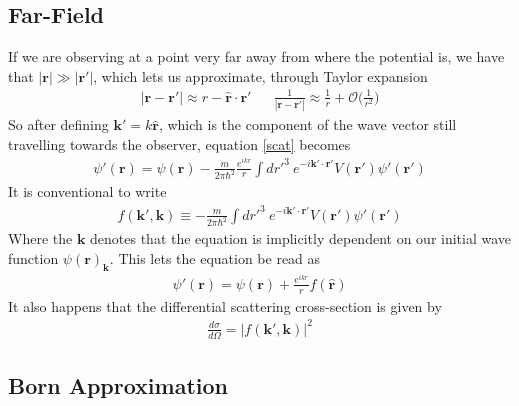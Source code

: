 \subsection{Far-Field}
If we are observing at a point very far away from where the potential is, we have that $|\textbf{r}| \gg |\textbf{r}'|$, which lets us approximate, through Taylor expansion
\begin{align}
|\textbf{r}-\textbf{r}'| \approx r-\hat{\textbf{r}}\cdot\textbf{r}' &&\frac{1}{|\textbf{r}-\textbf{r}'|} \approx \frac{1}{r} + \mathcal{O}\Big(\frac{1}{r^2}\Big)
\end{align}
So after defining $\textbf{k}' = k\hat{\textbf{r}}$, which is the component of the wave vector still travelling towards the observer, equation \ref{scat} becomes
\begin{align}
\psi'(\textbf{r}) = \psi(\textbf{r})  -\frac{m}{2\pi\hbar^2}\frac{e^{ikr}}{r}\int dr'^3~ e^{-i\textbf{k}'\cdot\textbf{r}' } V(\textbf{r}')\psi'(\textbf{r}')
\end{align}
It is conventional to write
\begin{align}
f(\textbf{k}',\textbf{k}) \equiv -\frac{m}{2\pi\hbar^2}\int dr'^3~ e^{-i\textbf{k}'\cdot\textbf{r}' } V(\textbf{r}')\psi'(\textbf{r}')
\end{align}
Where the $\textbf{k}$ denotes that the equation is implicitly dependent on our initial wave function $\psi(\textbf{r})_\textbf{k}$. This lets the equation be read as 
\begin{align}
\psi'(\textbf{r}) = \psi(\textbf{r}) + \frac{e^{ikr}}{r}f(\hat{\textbf{r}})
\end{align}
It also happens that the differential scattering cross-section is given by
\begin{align}
\frac{d\sigma}{d\Omega} = |f(\textbf{k}',\textbf{k})|^2
\end{align}

\subsection{Born Approximation}

